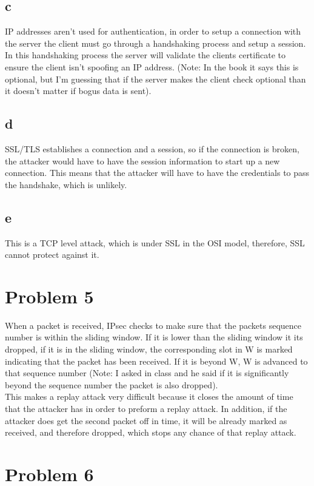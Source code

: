 \documentclass{article}
\begin{document}
\subsection*{c}
IP addresses aren't used for authentication, in order to setup a connection with the server the client must go through a handshaking process and setup a session. In this handshaking process the server will validate the clients certificate to ensure the client isn't spoofing an IP address. (Note: In the book it says this is optional, but I'm guessing that if the server makes the client check optional than it doesn't matter if bogus data is sent).\\
\subsection*{d}
SSL/TLS establishes a connection and a session, so if the connection is broken, the attacker would have to have the session information to start up a new connection. This means that the attacker will have to have the credentials to pass the handshake, which is unlikely.\\
\subsection{e}
This is a TCP level attack, which is under SSL in the OSI model, therefore, SSL cannot protect against it.\\
\section*{Problem 5}
When a packet is received, IPsec checks to make sure that the packets sequence number is within the sliding window. If it is lower than the sliding window it its dropped, if it is in the sliding window, the corresponding slot in W is marked indicating that the packet has been received. If it is beyond W, W is advanced to that sequence number (Note: I asked in class and he said if it is significantly beyond the sequence number the packet is also dropped).\\
This makes a replay attack very difficult because it closes the amount of time that the attacker has in order to preform a replay attack. In addition, if the attacker does get the second packet off in time, it will be already marked as received, and therefore dropped, which stops any chance of that replay attack.\\
\section*{Problem 6}
\end{document}
